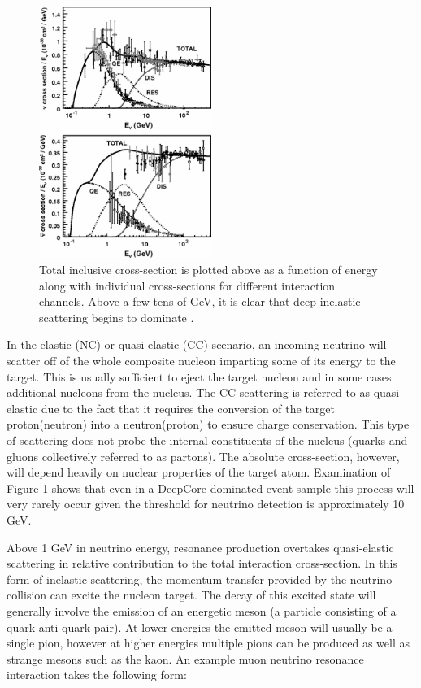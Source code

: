 \documentclass{gatech-thesis}
\begin{document}
\begin{figure}[ht]
  \begin{center}
    \includegraphics[width=0.5\textwidth,keepaspectratio]{neutrino_nucelon_crosssections.png}
  \end{center}
  \caption[Neutrino-nucleon Cross-section by Energy]{Total inclusive cross-section is plotted above as a function of energy along with individual cross-sections for different interaction channels. Above a few tens of GeV, it is clear that deep inelastic scattering begins to dominate \cite{2012RvMP...84.1307F}.}
  \label{fig:neutrino_scattering}
\end{figure}

In the elastic (NC) or quasi-elastic (CC) scenario, an incoming neutrino will scatter off of the whole composite nucleon imparting some of its energy to the target. This is usually sufficient to eject the target nucleon and in some cases additional nucleons from the nucleus. The CC scattering is referred to as quasi-elastic due to the fact that it requires the conversion of the target proton(neutron) into a neutron(proton) to ensure charge conservation. This type of scattering does not probe the internal constituents of the nucleus (quarks and gluons collectively referred to as partons). The absolute cross-section, however, will depend heavily on nuclear properties of the target atom. Examination of Figure \ref{fig:neutrino_scattering} shows that even in a DeepCore dominated event sample this process will very rarely occur given the threshold for neutrino detection is approximately 10 GeV.

Above 1 GeV in neutrino energy, resonance production overtakes quasi-elastic scattering in relative contribution to the total interaction cross-section. In this form of inelastic scattering, the momentum transfer provided by the neutrino collision can excite the nucleon target. The decay of this excited state will generally involve the emission of an energetic meson (a particle consisting of a quark-anti-quark pair). At lower energies the emitted meson will usually be a single pion, however at higher energies multiple pions can be produced as well as strange mesons such as the kaon. An example muon neutrino resonance interaction takes the following form:
\end{document}
